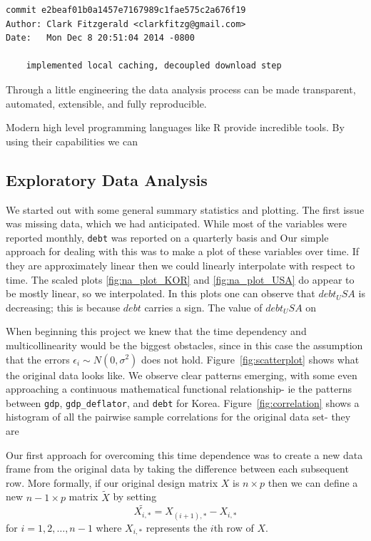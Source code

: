 \documentclass[12pt]{article}
\begin{document}
\begin{verbatim}
commit e2beaf01b0a1457e7167989c1fae575c2a676f19
Author: Clark Fitzgerald <clarkfitzg@gmail.com>
Date:   Mon Dec 8 20:51:04 2014 -0800

    implemented local caching, decoupled download step
\end{verbatim}

Through a little engineering the data analysis process
can be made transparent, automated, extensible, and fully reproducible.

Modern high level programming languages like R provide incredible tools. By
using their capabilities we can 

\subsection{Exploratory Data Analysis}

We started out with some general summary statistics and plotting. The first
issue was missing data, which we had anticipated. While most of the
variables were reported monthly, \texttt{debt} was reported on a quarterly
basis and 
Our simple approach for dealing with this was to
make a plot of these variables over time.
If they are approximately linear then we could 
linearly interpolate with respect to time. The scaled plots 
\ref{fig:na_plot_KOR} and
\ref{fig:na_plot_USA} do appear to be mostly linear, so we interpolated. 
In this plots one can observe that $debt_USA$ is decreasing; this is
because $debt$ carries a sign. The value of $debt_USA$ on 

When beginning this project we knew that the time dependency and
multicollinearity would be the
biggest obstacles, since in this case the assumption that the errors
$\epsilon_i \sim N(0, \sigma^2)$ does not hold.
Figure~\ref{fig:scatterplot} shows what the original data looks like.
We observe clear patterns emerging, with some even approaching a
continuous mathematical functional relationship- ie the patterns
between \texttt{gdp}, \texttt{gdp\_deflator}, and \texttt{debt} for Korea.
Figure~\ref{fig:correlation} shows a histogram of all the pairwise sample
correlations for the original data set- they are 

Our first approach for overcoming this time dependence was to create a new
data frame from the original data by taking the difference between each
subsequent row. More formally, if our original design matrix $X$ is $n
\times p$ then we can define a new $n - 1 \times p$ matrix $\tilde{X}$ by
setting
\[
    \tilde{X_{i,*}} = X_{(i + 1), *} - X_{i, *}
\]
for $i = 1, 2, \dots, n-1$ where $X_{i, *}$ represents the $i$th row of
$X$.
\end{document}
